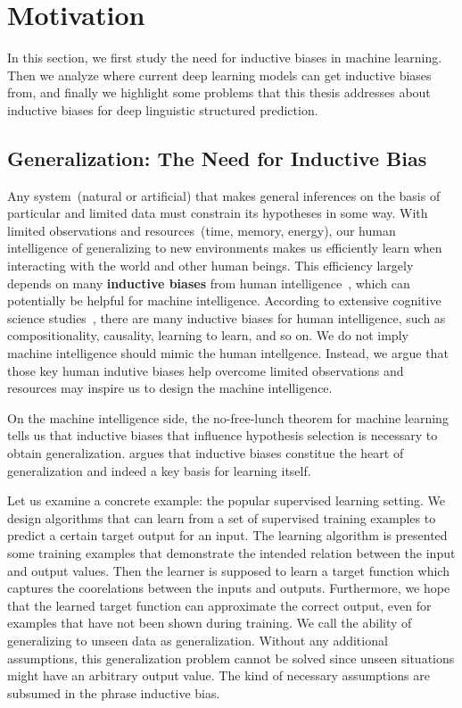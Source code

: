 \section{Motivation}
\label{sec:intro:motivation}

In this section, we first study the need for inductive biases in
machine learning. Then we analyze where current deep learning models
can get inductive biases from, and finally we highlight some problems
that this thesis addresses about inductive biases for deep linguistic
structured prediction.

\subsection{Generalization: The Need for Inductive Bias}
\label{ssec:intro:need-of-bias}

Any system~(natural or artificial) that makes general inferences on
the basis of particular and limited data must constrain its hypotheses
in some way. With limited observations and resources~(time, memory,
energy), our human intelligence of generalizing to new environments
makes us efficiently learn when interacting with the world and other
human beings. This efficiency largely depends on many {\bf inductive
  biases} from human intelligence~\citep{Gershman2021WhatMU}, which
can potentially be helpful for machine intelligence. According to
extensive cognitive science
studies~\citep{Spelke1990PrinciplesOO,Bienenstock1996CompositionalityMP,Rehder2003ACT,harlow1949formation,
  Lake2016BuildingMT,Gershman2021WhatMU}, there are many inductive
biases for human intelligence, such as compositionality, causality,
learning to learn, and so on. We do not imply machine intelligence
should mimic the human intellgence. Instead, we argue that those key
human indutive biases help overcome limited observations and resources
may inspire us to design the machine intelligence.

On the machine intelligence side, the no-free-lunch theorem for
machine learning~\citep{baxter2000model,wolpert1995no} tells us that
inductive biases that influence hypothesis selection is necessary to
obtain generalization. \citet{mitchell1980need} argues that inductive
biases constitue the heart of generalization and indeed a key basis
for learning itself.

Let us examine a concrete example: the popular supervised learning
setting.  We design algorithms that can learn from a set of supervised
training examples to predict a certain target output for an input. The
learning algorithm is presented some training examples that
demonstrate the intended relation between the input and output
values. Then the learner is supposed to learn a target function which
captures the coorelations between the inputs and outputs. Furthermore,
we hope that the learned target function can approximate the correct
output, even for examples that have not been shown during training. We
call the ability of generalizing to unseen data as
generalization. Without any additional assumptions, this
generalization problem cannot be solved since unseen situations might
have an arbitrary output value. The kind of necessary assumptions are
subsumed in the phrase inductive bias.


